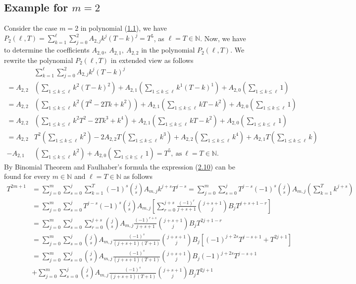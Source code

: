 \documentclass[11pt, letterpaper]{amsart}
\theoremstyle{definition}
\theoremstyle{remark}
\numberwithin{equation}{section}
\begin{document}
\subsection{Example for \texorpdfstring{$m=2$}{m=2}}
Consider the case $m=2$ in polynomial (\hyperref[f1]{1.1}), we have $P_2(\ell,T)=\sum_{k=1}^{\ell}\sum_{j=0}^2 A_{2,j}k^j(T-k)^j=T^5$, as $\ell=T\in\mathbb{N}$. Now, we have to determine the coefficients $A_{2,0}, \ A_{2,1}, \ A_{2,2}$ in the polynomial $P_2(\ell,T)$. We rewrite the polynomial $P_2(\ell,T)$ in extended view as follows
\begin{equation}\label{alb_3_1}
\begin{split}
&\sum_{k=1}^{\ell}\sum_{j=0}^2 A_{2,j}k^j(T-k)^j\\
=A_{2,2}&\left(\sum\limits_{1\leq k \leq \ell}k^2(T-k)^2\right)+A_{2,1}\left(\sum\limits_{1\leq k \leq \ell}k^1(T-k)^1\right)+A_{2,0}\left(\sum\limits_{1\leq k \leq \ell}1\right)\\
=A_{2,2}&\left(\sum\limits_{1\leq k \leq \ell} k^2(T^2-2Tk+k^2)\right)+A_{2,1}\left(\sum\limits_{1\leq k \leq \ell} kT-k^2\right) + A_{2,0}\left(\sum\limits_{1\leq k \leq \ell}1\right)\\
=A_{2,2}&\left(\sum\limits_{1\leq k \leq \ell} k^2T^2-2Tk^3+k^4\right)+A_{2,1}\left(\sum\limits_{1\leq k \leq \ell} kT-k^2\right) + A_{2,0}\left(\sum\limits_{1\leq k \leq \ell}1\right) \\
=A_{2,2}&T^2\left(\sum\limits_{1\leq k \leq \ell}k^2\right)-2A_{2,2}T\left(\sum\limits_{1\leq k \leq \ell}k^3\right)+A_{2,2}\left(\sum\limits_{1\leq k \leq \ell}k^4\right)+A_{2,1}T\left(\sum\limits_{1\leq k \leq \ell} k\right) \\
-A_{2,1}&\left(\sum\limits_{1\leq k \leq \ell}k^2\right)+A_{2,0}\left(\sum\limits_{1\leq k \leq \ell}1\right)=T^5, \ \mathrm{as} \ \ell=T\in\mathbb{N}.
\end{split}
\end{equation}
By Binomial Theorem and Faulhaber's formula the expression (\hyperref[alb_3_1]{2.10}) can be found for every $m\in\mathbb{N}$ and $\ell=T\in\mathbb{N}$ as follows
\begin{equation*}
\begin{split}
T^{2m+1}
&=\sum_{j=0}^{m}\sum_{s=0}^{j}\sum_{k=1}^{T}(-1)^s \binom{j}{s} A_{m,j} k^{j+s} T^{j-s}=\sum_{j=0}^{m}\sum_{s=0}^{j} T^{j-s}(-1)^s \binom{j}{s} A_{m,j}\left(\sum_{k=1}^{T} k^{j+s}\right)\\
&=\sum_{j=0}^{m}\sum_{s=0}^{j} T^{j-s}(-1)^s \binom{j}{s} A_{m,j}\left[\sum_{r=0}^{j+s}\frac{(-1)^r}{j+s+1}\binom{j+s+1}{j}B_{j}T^{j+s+1-r}\right]\\
&=\sum_{j=0}^{m}\sum_{s=0}^{j}\sum_{r=0}^{j+s}\binom{j}{s} A_{m,j}\frac{(-1)^{r+s}}{j+s+1}\binom{j+s+1}{j}B_{j}T^{2j+1-r}\\
&=\sum_{j=0}^{m}\sum_{s=0}^{j}\binom{j}{s} A_{m,j}\frac{(-1)^s}{(j+s+1)(T+1)}\binom{j+s+1}{j}B_{j}[(-1)^{j+2s}T^{j-s+1}+T^{2j+1}]\\
&=\sum_{j=0}^{m}\sum_{s=0}^{j}\binom{j}{s} A_{m,j}\frac{(-1)^s}{(j+s+1)(T+1)}\binom{j+s+1}{j}B_{j}(-1)^{j+2s}T^{j-s+1}\\
&+\sum_{j=0}^{m}\sum_{s=0}^{j}\binom{j}{s} A_{m,j}\frac{(-1)^s}{(j+s+1)(T+1)}\binom{j+s+1}{j}B_{j}T^{2j+1}
\end{split}
\end{equation*}
\end{document}

